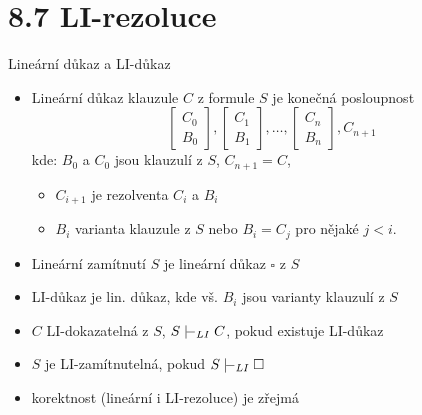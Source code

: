 \documentclass{beamer}
\begin{document}
\section{8.7 LI-rezoluce}


\begin{frame}{Lineární důkaz a LI-důkaz}

    \begin{itemize}
        \item \alert{Lineární důkaz} klauzule $C$ z formule $S$ je konečná posloupnost
        $$
        \begin{bmatrix}
            C_0 \\
            B_0
        \end{bmatrix},
        \begin{bmatrix}
            C_1 \\
            B_1
        \end{bmatrix},\dots,
        \begin{bmatrix}
            C_n \\
            B_n
        \end{bmatrix},
        C_{n+1}
        $$
        kde: $B_0$ a $C_0$ jsou  klauzulí z $S$, $C_{n+1}=C$,
        \begin{itemize}
            \item $C_{i+1}$ je rezolventa $C_i$ a $B_i$
            \item $B_i$ \alert{varianta} klauzule z $S$ nebo $B_i=C_j$ pro nějaké $j<i$.
        \end{itemize}
        \item \alert{Lineární zamítnutí} $S$ je lineární důkaz $\square$ z $S$
        
        \item \alert{LI-důkaz} je lin. důkaz, kde vš. $B_i$ jsou varianty klauzulí z $S$
        \item $C$ \alert{LI-dokazatelná} z $S$, \alert{$S\proves_{LI}C$}, pokud existuje LI-důkaz
        \item $S$ je \alert{LI-zamítnutelná}, pokud $S\proves_{LI}\square$    
        \item korektnost (lineární i LI-rezoluce) je zřejmá
    \end{itemize}

    
\end{frame}
\end{document}
